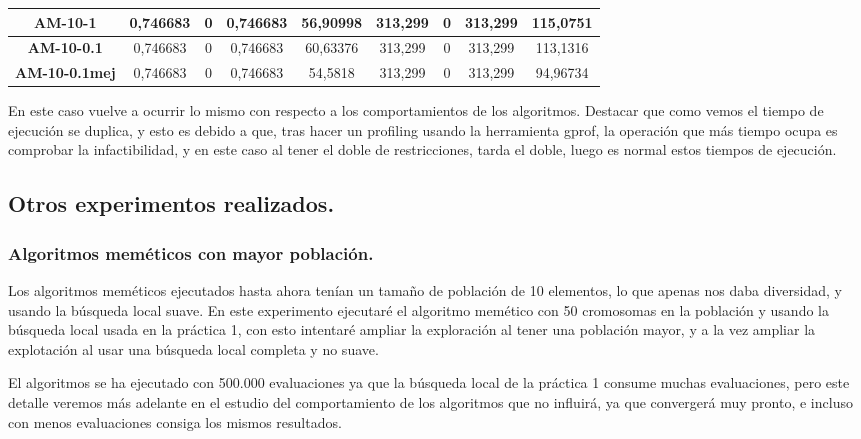 \documentclass[12pt, spanish]{article}
\begin{document}
\begin{table}[H]
\begin{tabular}{|c|c|c|c|c|c|c|c|c|}
\textbf{AM-10-1}      & 0,746683                  & 0                           & 0,746683               & 56,90998   & 313,299                   & 0                           & 313,299                & 115,0751   \\ \hline
\textbf{AM-10-0.1}    &  0,746683               & 0                    &  0,746683                    & 60,63376      & 313,299                   & 0                           & 313,299                & 113,1316   \\ \hline
\textbf{AM-10-0.1mej} & 0,746683                  & 0                           & 0,746683               & 54,5818    & 313,299                   & 0                           & 313,299                & 94,96734   \\ \hline
\end{tabular}
\end{table}

En este caso vuelve a ocurrir lo mismo con respecto a los comportamientos de los algoritmos. Destacar que como vemos el tiempo de ejecución se duplica, y esto es debido a que, tras hacer un profiling usando la herramienta gprof, la operación que más tiempo ocupa es comprobar la infactibilidad, y en este caso al tener el doble de restricciones, tarda el doble, luego es normal estos tiempos de ejecución. 

\newpage

\subsection{Otros experimentos realizados.}

\subsubsection{Algoritmos meméticos con mayor población.}

Los algoritmos meméticos ejecutados hasta ahora tenían un tamaño de población de 10 elementos, lo que apenas nos daba diversidad, y usando la búsqueda local suave. En este experimento ejecutaré el algoritmo memético con 50 cromosomas en la población y usando la búsqueda local usada en la práctica 1, con esto intentaré ampliar la exploración al tener una población mayor, y a la vez ampliar la explotación al usar una búsqueda local completa y no suave.

El algoritmos se ha ejecutado con 500.000 evaluaciones ya que la búsqueda local de la práctica 1 consume muchas evaluaciones, pero este detalle veremos más adelante en el estudio del comportamiento de los algoritmos que no influirá, ya que convergerá muy pronto, e incluso con menos evaluaciones consiga los mismos resultados.
\end{document}

